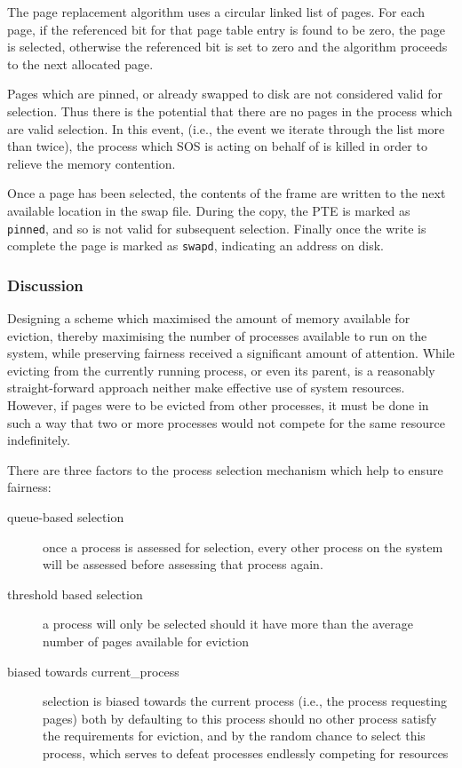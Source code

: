\documentclass[a4paper,12pt]{article}
\begin{document}
The page replacement algorithm uses a circular linked list of pages.  For each
page, if the referenced bit for that page table entry is found to be zero, the
page is selected, otherwise the referenced bit is set to zero and the
algorithm proceeds to the next allocated page.

Pages which are pinned, or already swapped to disk are not considered valid
for selection.  Thus there is the potential that there are no pages in the
process which are valid selection.  In this event, (i.e., the event we iterate
through the list more than twice), the process which SOS is acting on behalf
of is killed in order to relieve the memory contention.

Once a page has been selected, the contents of the frame are written to the
next available location in the swap file.  During the copy, the PTE is marked
as \texttt{pinned}, and so is not valid for subsequent selection.  Finally
once the write is complete the page is marked as \texttt{swapd}, indicating an
address on disk.

\subsubsection{Discussion}
Designing a scheme which maximised the amount of memory available for
eviction, thereby maximising the number of processes available to run on the
system, while preserving fairness received a significant amount of attention.
While evicting from the currently running process, or even its parent, is a
reasonably straight-forward approach neither make effective use of system
resources.  However, if pages were to be evicted from other processes, it must
be done in such a way that two or more processes would not compete for the
same resource indefinitely.

There are three factors to the process selection mechanism which help to
ensure fairness:
\begin{description}
\item[queue-based selection] once a process is assessed for selection, every
  other process on the system will be assessed before assessing that process
  again.
\item[threshold based selection] a process will only be selected should it
  have more than the average number of pages available for eviction
\item[biased towards current\_process] selection is biased towards the current
  process (i.e., the process requesting pages) both by defaulting to this
  process should no other process satisfy the requirements for eviction, and
  by the random chance to select this process, which serves to defeat
  processes endlessly competing for resources
\end{description}
\end{document}
